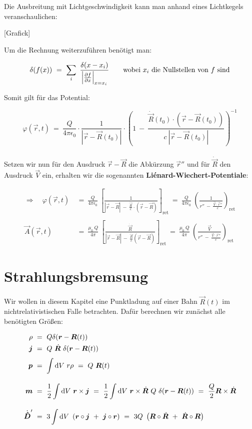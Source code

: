 Die Ausbreitung mit Lichtgeschwindigkeit kann man anhand eines Lichtkegels veranschaulichen:

[Grafick]

Um die Rechnung weiterzuführen benötigt man:

\begin{equation*}
\delta(f(x))  \ = \  \sum_i \ \frac{\delta(x-x_i)}{\left|\pdiff{f}{x}\right|_{x=x_i}} \qquad\text{wobei $x_i$ die Nullstellen von $f$ sind}
\end{equation*}


Somit gilt für das Potential:

\begin{equation*}
\varphi(\vec{r},t)  \ = \ \frac{Q}{4\pi\epsilon_0}\cdot \frac{1}{|\vec{r}-\vec{R}(t_0)|} \cdot \left(1\ - \ \frac{\dot{\vec{R}}(t_0) \cdot (\vec{r}-\vec{R}(t_0))}{c \ |\vec{r}-\vec{R}(t_0)|}\right)^{-1}
\end{equation*}\\

Setzen wir nun für den Ausdruck $\vec{r}-\vec{R}$ die Abkürzung $\vec{r}''$ und für $\dot{\vec{R}}$ den Ausdruck $\vec{V}$ ein, erhalten wir die sogenannten \textbf{Liénard-Wiechert-Potentiale}:

\begin{align*}
\Rightarrow \quad \varphi(\vec{r},t)  \ &= \ \frac{Q}{4\pi\epsilon_0} \ \left[\frac{1}{|\vec{r}-\vec{R}| \ - \ \frac{\dot{\vec{R}}}{c} \cdot (\vec{r}-\vec{R})}\right]_{\text{ret}}  \ = \ \frac{Q}{4\pi\epsilon_0} \ \left(\frac{1}{r'' \ - \ \frac{ \vec{V}\cdot \vec{r}''}{c}}\right)_{\text{ret}}\\
\ \\
\vec{A}(\vec{r},t) \ &= \ \frac{\mu_0 \ Q}{4\pi} \ \left[\frac{\dot{\vec{R}}}{|\vec{r}-\vec{R}| \ - \ \frac{\dot{\vec{R}}}{c}(\vec{r}-\vec{R})}\right]_{\text{ret}}  \ = \  \frac{\mu_0 \ Q}{4\pi} \ \left(\frac{\vec{V}}{r'' \ - \ \frac{\vec{V}\cdot\vec{r}''}{c}}\right)_{\text{ret}} 
\end{align*}	


\section{Strahlungsbremsung}

Wir wollen in diesem Kapitel eine Punktladung auf einer Bahn 
$\vec{R}(t)$ im nichtrelativistischen Falle betrachten. Dafür berechnen wir zunächst alle benötigten Größen:

\begin{align*}
\rho  \ &= \ Q \delta(\vec{r}-\vec{R}(t))\\
\vec{j}  \ &= \ Q \  \dot{\vec{R}} \ \delta(\vec{r}-\vec{R}(t))\\
\vec{p} \ &= \ \Int{}{}{V}r\rho  \ = \  Q \ \vec{R}(t)\\
\vec{m}  \ &= \ \frac{1}{2} \Int{}{}{V} \vec{r}\times\vec{j}  \ = \ \frac{1}{2}\Int{}{}{V}\vec{r}\times\dot{\vec{R}}\ Q \ \delta(\vec{r}-\vec{R}(t)) \ = \ \frac{Q}{2} \vec{R}\times\dot{\vec{R}}\\
\dot{\tens{D}}'  \ &= \ 3 \Int{}{}{V} \left(\vec{r}\circ\vec{j} \ + \ \vec{j}\circ\vec{r}\right)  \ = \ 3Q \ \left(\vec{R}\circ\dot{\vec{R}} \ + \ \dot{\vec{R}}\circ\vec{R}\right)
\end{align*}

